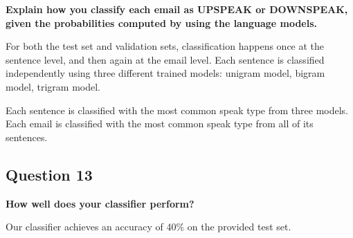 \documentclass{article} %
\begin{document}
\textbf{Explain how you classify each email as UPSPEAK or DOWNSPEAK, given the probabilities computed by using the language models.}

For both the test set and validation sets, classification happens once at the sentence level, and then again at the email level. Each sentence is classified independently using three different trained models: unigram model, bigram model, trigram model. 

Each sentence is classified with the most common speak type from three models. Each email is classified with the most common speak type from all of its sentences.

\subsection*{Question 13}

\textbf{How well does your classifier perform?}

Our classifier achieves an accuracy of 40$\%$ on the provided test set.
\end{document}
